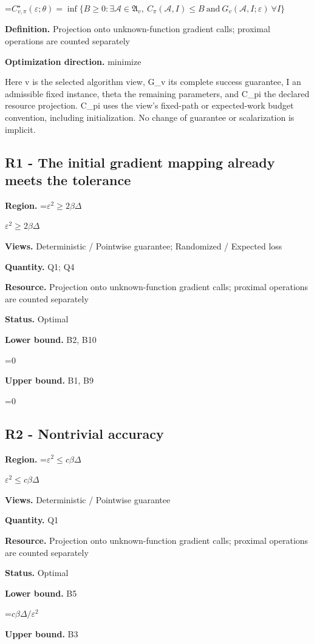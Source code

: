 \documentclass[10pt,a4paper]{article}
\newcommand{\AtlasMath}[1]{\par\begingroup\centering\setbox0=\hbox{$\displaystyle #1$}\ifdim\wd0>1.4\linewidth\typeout{ATLAS WIDE FORMULA: \the\wd0}\fi\ifdim\wd0>\linewidth\resizebox{\linewidth}{!}{\box0}\else\box0\fi\par\endgroup}
\newcommand{\AtlasInlineMath}[1]{\begingroup\setbox0=\hbox{$#1$}\ifdim\wd0>.4\linewidth\endgroup\AtlasMath{#1}\else\endgroup$#1$\fi}
\begin{document}
\AtlasMath{C^\star_{v,\pi}(\varepsilon;\theta)=\inf\{B\ge0:\exists\mathcal A\in\mathfrak A_v,\ C_\pi(\mathcal A,I)\le B\ \text{and}\ G_v(\mathcal A,I;\varepsilon)\ \forall I\}}
\textbf{Definition.} Projection onto unknown-function gradient calls; proximal operations are counted separately

\textbf{Optimization direction.} minimize

Here v is the selected algorithm view, G\_v its complete success guarantee, I an admissible fixed instance, theta the remaining parameters, and C\_pi the declared resource projection. C\_pi uses the view's fixed-path or expected-work budget convention, including initialization. No change of guarantee or scalarization is implicit.

\subsection{R1 - The initial gradient mapping already meets the tolerance}
\textbf{Region.} \AtlasInlineMath{\varepsilon^2\ge2\beta\Delta}

\textbf{Views.} Deterministic / Pointwise guarantee; Randomized / Expected loss

\textbf{Quantity.} Q1; Q4

\textbf{Resource.} Projection onto unknown-function gradient calls; proximal operations are counted separately

\textbf{Status.} Optimal

\textbf{Lower bound.} B2, B10

\AtlasMath{0}
\textbf{Upper bound.} B1, B9

\AtlasMath{0}
\subsection{R2 - Nontrivial accuracy}
\textbf{Region.} \AtlasInlineMath{\varepsilon^2\le c\beta\Delta}

\textbf{Views.} Deterministic / Pointwise guarantee

\textbf{Quantity.} Q1

\textbf{Resource.} Projection onto unknown-function gradient calls; proximal operations are counted separately

\textbf{Status.} Optimal

\textbf{Lower bound.} B5

\AtlasMath{c\beta\Delta/\varepsilon^2}
\textbf{Upper bound.} B3
\end{document}
